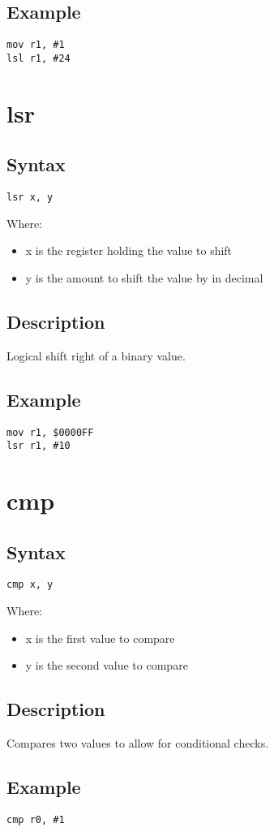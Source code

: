 \documentclass[11pt]{scrartcl}
\begin{document}
\subsection{Example}
\begin{verbatim}
mov r1, #1
lsl r1, #24
\end{verbatim}

\section{lsr}
\subsection{Syntax}
\begin{verbatim}
lsr x, y
\end{verbatim}
Where:
\begin{itemize}
    \item x is the register holding the value to shift
    \item y is the amount to shift the value by in decimal
\end{itemize}
\subsection{Description}
Logical shift right of a binary value.
\subsection{Example}
\begin{verbatim}
mov r1, $0000FF
lsr r1, #10
\end{verbatim}

\section{cmp}
\subsection{Syntax}
\begin{verbatim}
cmp x, y
\end{verbatim}
Where:
\begin{itemize}
    \item x is the first value to compare
    \item y is the second value to compare
\end{itemize}
\subsection{Description}
Compares two values to allow for conditional checks.
\subsection{Example}
\begin{verbatim}
cmp r0, #1
\end{verbatim}
\end{document}

